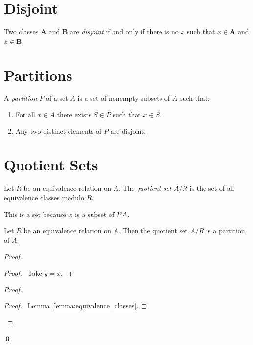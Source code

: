 \section{Disjoint}

\begin{definition}[Disjoint]
    Two classes $\mathbf{A}$ and $\mathbf{B}$ are \emph{disjoint} if and only if there is no $x$
    such that $x \in \mathbf{A}$ and $x \in \mathbf{B}$.
\end{definition}

\section{Partitions}

\begin{definition}[Partition]
    A \emph{partition} $P$ of a set $A$ is a set of nonempty subsets of $A$ such that:
    \begin{enumerate}
        \item For all $x \in A$ there exists $S \in P$ such that $x \in S$.
        \item Any two distinct elements of $P$ are disjoint.
    \end{enumerate}
\end{definition}

\section{Quotient Sets}

\begin{definition}
    Let $R$ be an equivalence relation on $A$. The \emph{quotient set} $A / R$
    is the set of all equivalence classes modulo $R$.

    This is a set because it is a subset of $\mathcal{P} A$.
\end{definition}

\begin{theorem}
    Let $R$ be an equivalence relation on $A$. Then the quotient set $A / R$
    is a partition of $A$.
\end{theorem}

\begin{proof}
    \pf
    \begin{proof}
        \pf\ Take $y = x$.
    \end{proof}
    \begin{proof}
        \begin{proof}
            \pf\ Lemma \ref{lemma:equivalence_classes}.
        \end{proof}
    \end{proof}
    \qed
\end{proof}

